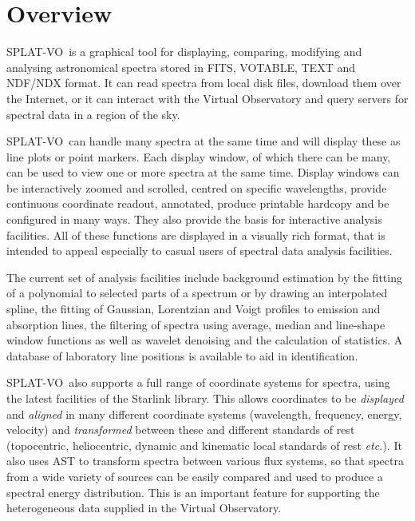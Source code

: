 \documentclass[twoside,11pt,nolof]{starlink}
\providecommand{\SPLAT}{\textsf{SPLAT-VO}}
\providecommand{\etc}{\textit{etc.}}
\begin{document}
\ifpdf
\else
\fi


\scfrontmatter

\section{Overview}

\SPLAT\ is a graphical tool for displaying, comparing, modifying and analysing
astronomical spectra stored in FITS, VOTABLE, TEXT and NDF/NDX format. It can read
spectra from local disk files, download them over the Internet, or it can
interact with the Virtual Observatory and query servers for spectral data in a
region of the sky.

\SPLAT\ can handle many spectra at the same time and will display these as
line plots or point markers.
Each display window, of which there can be many, can be used to
view one or more spectra at the same time.
Display windows can be interactively zoomed and scrolled, centred on
specific wavelengths, provide continuous coordinate readout, annotated,
produce printable hardcopy and be configured in many ways.
They also provide the basis for interactive analysis facilities.
All of these functions are displayed in a visually rich format, that
is intended to appeal especially to casual users of spectral data
analysis facilities.

The current set of analysis facilities include background estimation by the
fitting of a polynomial to selected parts of a spectrum or by drawing an
interpolated spline, the fitting of Gaussian, Lorentzian and Voigt profiles to
emission and absorption lines, the filtering of spectra using average,
median and line-shape window functions as well as wavelet denoising and
the calculation of statistics.
A database of laboratory line positions is available to aid in identification.

\SPLAT\ also supports a full range of coordinate systems for spectra,
using the latest facilities of the Starlink 
library.
This allows coordinates to be \textit{displayed} and \textit{aligned}
in many different coordinate systems (wavelength, frequency, energy,
velocity) and \textit{transformed} between these and different
standards of rest (topocentric, heliocentric, dynamic and kinematic
local standards of rest \etc).
It also uses AST to transform spectra between various flux systems, so that
spectra from a wide variety of sources can be easily compared and used to
produce a spectral energy distribution.
This is an important feature for supporting the heterogeneous data supplied
in the Virtual Observatory.
\end{document}
